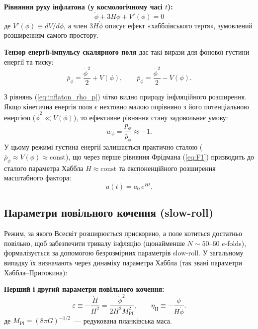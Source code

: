\documentclass[12pt, a4paper]{article}
\begin{document}
\begin{keybox}
\textbf{Рівняння руху інфлатона (у космологічному часі $t$):}
\begin{equation}\label{eq:klein_gordon}
  \ddot{\phi} + 3H\dot{\phi} + V'(\phi) = 0
\end{equation}
де $V'(\phi) \equiv dV/d\phi$, а член $3H\dot{\phi}$ описує ефект «хабблівського тертя», зумовлений розширенням самого простору.

\textbf{Тензор енергії-імпульсу скалярного поля} дає такі вирази для фонової густини енергії та тиску:
\begin{equation}\label{eq:inflaton_rho_p}
  \bar{\rho}_\phi = \frac{\dot{\phi}^2}{2} + V(\phi), \qquad \bar{p}_\phi = \frac{\dot{\phi}^2}{2} - V(\phi).
\end{equation}
\end{keybox}

З рівнянь (\ref{eq:inflaton_rho_p}) чітко видно природу інфляційного розширення. Якщо кінетична енергія поля є нехтовно малою порівняно з його потенціальною енергією ($\dot{\phi}^2 \ll V(\phi)$), то ефективне рівняння стану задовольняє умову:
\begin{equation*}
  w_\phi = \frac{\bar{p}_\phi}{\bar{\rho}_\phi} \approx -1.
\end{equation*}
У цьому режимі густина енергії залишається практично сталою ($\bar{\rho}_\phi \approx V(\phi) \approx \text{const}$), що через перше рівняння Фрідмана (\ref{eq:F1}) призводить до сталого параметра Хаббла $H \approx \text{const}$ та експоненційного розширення масштабного фактора:
\begin{equation*}
  a(t) = a_0 \, e^{Ht}.
\end{equation*}

\subsection{Параметри повільного кочення (slow-roll)}

Режим, за якого Всесвіт розширюється прискорено, а поле котиться достатньо повільно, щоб забезпечити тривалу інфляцію (щонайменше $N \sim 50$--$60$ $e$-folds), формалізується за допомогою безрозмірних параметрів slow-roll. У загальному випадку їх визначають через динаміку параметра Хаббла (так звані параметри Хаббла--Пригожина):

\begin{keybox}
\textbf{Перший і другий параметри повільного кочення:}
\begin{equation}\label{eq:slow_roll_def}
  \varepsilon \equiv -\frac{\dot H}{H^2} = \frac{\dot\phi^2}{2H^2 M_\mathrm{Pl}^2},
  \qquad
  \eta_\mathrm{H} \equiv -\frac{\ddot{\phi}}{H\dot{\phi}}.
\end{equation}
де $M_\mathrm{Pl} = (8\pi G)^{-1/2}$~--- редукована планківська маса.
\end{keybox}
\end{document}
